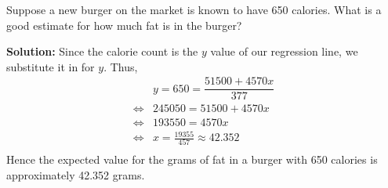 Suppose a new burger on the market is known to have 650 calories. What is a good
    estimate for how much fat is in the burger?

    \nl \textbf{Solution: } Since the calorie count is the $y$ value of our regression line, we substitute it in for $y$. Thus,
    \begin{align*}
        & y = 650 = \dfrac{51500 + 4570x}{377} \\
        \iff & 245050 = 51500 + 4570x\\
        \iff & 193550 = 4570x\\
        \iff & x = \frac{19355}{457} \approx 42.352\\
    \end{align*}
    Hence the expected value for the grams of fat in a burger with 650 calories is approximately 42.352 grams. 

